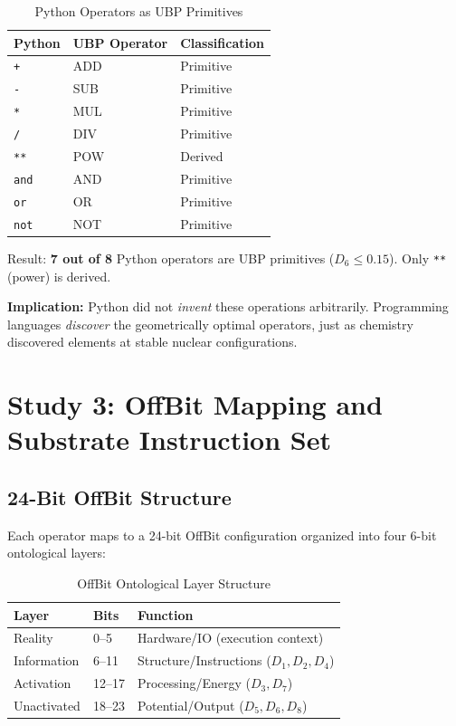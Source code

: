 \documentclass[12pt,a4paper]{article}
\begin{document}
\begin{table}[h]
\centering
\begin{tabular}{lll}
\toprule
\textbf{Python} & \textbf{UBP Operator} & \textbf{Classification} \\
\midrule
\texttt{+} & ADD & Primitive \\
\texttt{-} & SUB & Primitive \\
\texttt{*} & MUL & Primitive \\
\texttt{/} & DIV & Primitive \\
\texttt{**} & POW & Derived \\
\texttt{and} & AND & Primitive \\
\texttt{or} & OR & Primitive \\
\texttt{not} & NOT & Primitive \\
\bottomrule
\end{tabular}
\caption{Python Operators as UBP Primitives}
\label{tab:python}
\end{table}

Result: \textbf{7 out of 8} Python operators are UBP primitives ($D_6 \leq 0.15$). Only \texttt{**} (power) is derived.

\textbf{Implication:} Python did not \emph{invent} these operations arbitrarily. Programming languages \emph{discover} the geometrically optimal operators, just as chemistry discovered elements at stable nuclear configurations.

\section{Study 3: OffBit Mapping and Substrate Instruction Set}

\subsection{24-Bit OffBit Structure}

Each operator maps to a 24-bit OffBit configuration organized into four 6-bit ontological layers:

\begin{table}[h]
\centering
\begin{tabular}{lll}
\toprule
\textbf{Layer} & \textbf{Bits} & \textbf{Function} \\
\midrule
Reality & 0--5 & Hardware/IO (execution context) \\
Information & 6--11 & Structure/Instructions ($D_1, D_2, D_4$) \\
Activation & 12--17 & Processing/Energy ($D_3, D_7$) \\
Unactivated & 18--23 & Potential/Output ($D_5, D_6, D_8$) \\
\bottomrule
\end{tabular}
\caption{OffBit Ontological Layer Structure}
\label{tab:offbit_layers}
\end{table}
\end{document}
